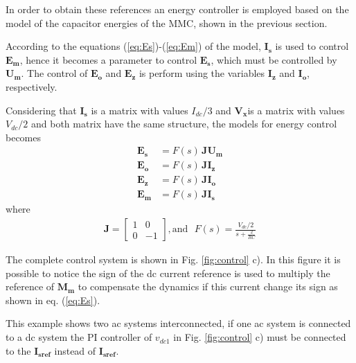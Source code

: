 \documentclass[conference]{IEEEtran}
\begin{document}
In order to obtain these references an energy controller is employed based on the model of the capacitor energies of the MMC, shown in the previous section.  

According to the equations (\ref{eq:Es})-(\ref{eq:Em}) of the model,  $\mathbf{I_s}$ is used to control  $\mathbf{E_m}$, hence it becomes a parameter to control  $\mathbf{E_s}$, which must be controlled by  $\mathbf{U_m}$. The control of  $\mathbf{E_o}$ and $\mathbf{E_z}$ is perform using the variables  $\mathbf{I_z}$ and $\mathbf{I_o}$, respectively. 

Considering that $\mathbf{I_s}$ is a matrix with values $I_{dc}/3$ and $\mathbf{V_x}$is a matrix with values $V_{dc}/2$ and both matrix have the same structure, the models for energy control becomes
\begin{align}
\mathbf{E_s}&=F(s)\,\mathbf{J}\mathbf{U_m}\\
\mathbf{E_o}&=F(s)\,\mathbf{J}\mathbf{I_z}\\ 
\mathbf{E_z}&=F(s)\,\mathbf{J}\mathbf{I_o} \\
\mathbf{E_m}&=F(s)\,\mathbf{J}\mathbf{I_s}
\end{align}
where  
\begin{align}
\mathbf{J}=\left[\begin{array}{cc}1&0\\0&-1\end{array}\right]
, \text{and}\:\:\: F(s)=\frac{V_{dc}/2}{s+\frac{2}{RC}}
\end{align}

The complete control system is shown in Fig. \ref{fig:control} c). In this figure it is possible to notice the sign of the dc current reference is used to multiply the reference of $\mathbf{M_m}$ to compensate the dynamics if this current change its sign as shown in eq. (\ref{eq:Es}).

This example shows two ac systems interconnected, if one ac system is connected to a dc system the PI controller of $v_{dc1}$ in Fig. \ref{fig:control} c) must be connected to the $\mathbf{I_{sref}}$ instead of  $\mathbf{I_{sref}}$.
\end{document}
